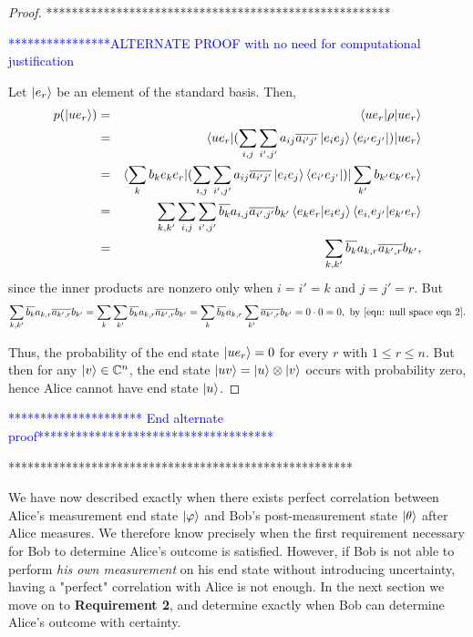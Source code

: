 \begin{proof}
******************************************************



\textcolor{blue}{****************ALTERNATE PROOF with no need for computational justification}

Let $\ket{e_r}$ be an element of the standard basis.  Then,
\begin{eqnarray*}
p(\ket{ue_r})&=&\braket{ue_r | \rho |ue_r}\\
&=&\braket{ue_r| (\sum_{i,j} \sum_{i',j'} a_{ij} \overline{a_{i'j'}}\ket{e_i e_j}\bra{e_{i'} e_{j'}})|ue_r} \\
&=&\braket{\sum_k b_ke_k e_r| (\sum_{i,j} \sum_{i',j'} a_{ij} \overline{a_{i'j'}}\ket{e_i e_j}\bra{e_{i'} e_{j'}})|\sum_{k'}b_{k'}e_{k'}e_r}\\
&=&\sum_{k,k'}\sum_{i,j}\sum_{i',j'}\overline{b_k}a_{i,j}\overline{a_{i',j'}}b_{k'}\braket{e_k e_r|e_i e_j}\braket{e_{i,}e_{j'}|e_{k'}e_r}\\
&=&\sum_{k,k'}\overline{b_k}a_{k,r}\overline{a_{k',r}}b_{k'},
\end{eqnarray*}
since the inner products are nonzero only when $i=i'=k$ and $j=j'=r$.  But
\begin{equation*}
\sum_{k,k'}\overline{b_k}a_{k,r}\overline{a_{k',r}}b_{k'}=\sum_k \sum_{k'} \overline{b_k}a_{k,r}\overline{a_{k',r}}b_{k'}
=\sum_k \overline{b_k}a_{k,r} \sum_{k'}\overline{a_{k',r}}b_{k'}
=0\cdot 0=0, \textrm{ by }\eqref{eqn: null space eqn 2}.
\end{equation*}

Thus, the probability of the end state $\ket{u e_r}=0$ for every $r$ with $1\leq r \leq n$.  But then for any $\ket{v} \in {\mathbb{C}}^n$, the end state $\ket{uv} = \ket{u}\otimes\ket{v}$ occurs with probability zero, hence Alice cannot have end state $\ket{u}$.
\end{proof}


\textcolor{blue}{********************* End alternate proof*************************************}


******************************************************



We have now described exactly when there exists perfect correlation between Alice's measurement end state $\ket{\varphi}$ and Bob's post-measurement state $\ket{\theta}$ after Alice measures.  We therefore know precisely when the first requirement necessary for Bob to determine Alice's outcome is satisfied.  However, if Bob is not able to perform {\emph{his own measurement}} on his end state without introducing uncertainty, having a "perfect" correlation with Alice is not enough. In the next section we move on to {\bf{Requirement 2}}, and determine exactly when Bob can determine Alice's outcome with certainty.


